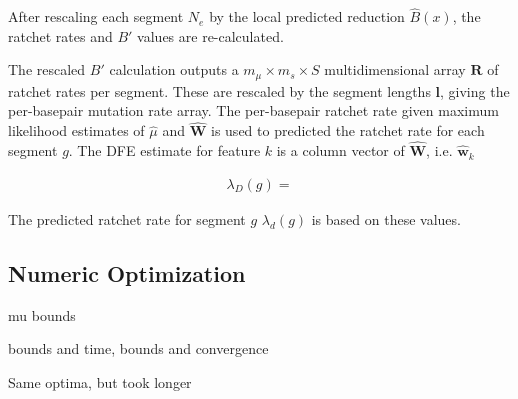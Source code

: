 \documentclass[11pt]{article}
\begin{document}
After rescaling each segment $N_e$ by the local predicted reduction
$\hat{B}(x)$, the ratchet rates and $B'$ values are re-calculated. 

The rescaled $B'$ calculation outputs a $m_\mu \times m_s \times S$
multidimensional array $\mathbf{R}$ of ratchet rates per segment. These are
rescaled by the segment lengths $\mathbf{l}$, giving the per-basepair mutation
rate array. The per-basepair ratchet rate given maximum likelihood estimates of
$\hat{\mu}$ and $\widehat{\mathbf{W}}$ is used to predicted the ratchet rate
for each segment $g$. The DFE estimate for feature $k$ is a column vector of
$\widehat{\mathbf{W}}$, i.e. $\widehat{\mathbf{w}}_k$

\begin{align}
  \lambda_D(g) = 
\end{align}

The predicted ratchet rate for segment $g$ $\lambda_d(g)$ is based on these
values.
 
\subsection{Numeric Optimization}


mu bounds 

bounds and time, bounds and convergence

Same optima, but took longer

%
%
%
%
%
%
%
%
%
\printbibliography
\end{document}
